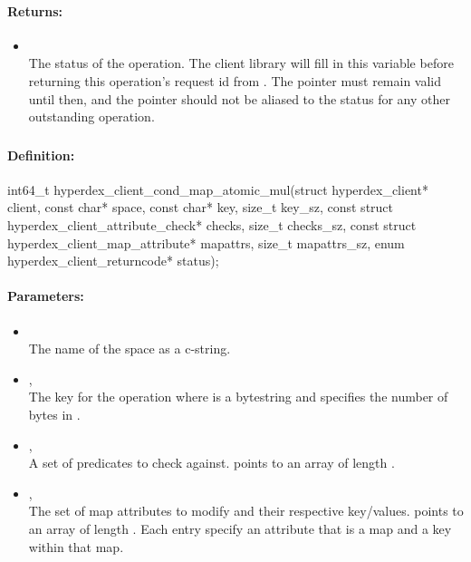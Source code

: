 \paragraph{Returns:}
\begin{itemize}[noitemsep]
\item {}\\
The status of the operation.  The client library will fill in this variable before returning this operation's request id from .  The pointer must remain valid until then, and the pointer should not be aliased to the status for any other outstanding operation.
\end{itemize}

\pagebreak
\subsubsection{}
\label{api:c:cond_map_atomic_mul}


\paragraph{Definition:}
\begin{ccode}
int64_t hyperdex_client_cond_map_atomic_mul(struct hyperdex_client* client,
        const char* space,
        const char* key, size_t key_sz,
        const struct hyperdex_client_attribute_check* checks, size_t checks_sz,
        const struct hyperdex_client_map_attribute* mapattrs, size_t mapattrs_sz,
        enum hyperdex_client_returncode* status);
\end{ccode}

\paragraph{Parameters:}
\begin{itemize}[noitemsep]
\item {}\\
The name of the space as a c-string.
\item {}, \\
The key for the operation where  is a bytestring and  specifies the number of bytes in .
\item {}, \\
A set of predicates to check against.   points to an array of length .
\item {}, \\
The set of map attributes to modify and their respective key/values.   points to an array of length .  Each entry specify an attribute that is a map and a key within that map.
\end{itemize}

